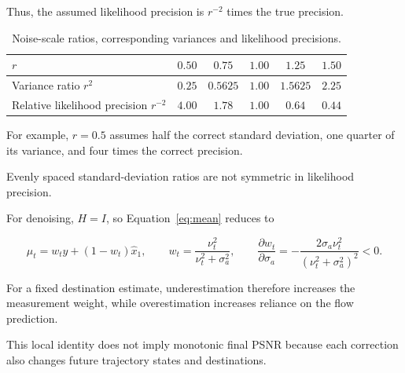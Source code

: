 \documentclass[11pt,a4paper]{article}
\newcommand{\sa}{\sigma_a}
\begin{document}
Thus, the assumed likelihood precision is $r^{-2}$ times the true
precision.

\begin{table}[htbp]

\centering
\small

\caption{
Noise-scale ratios, corresponding variances and likelihood precisions.
}
\label{tab:ratios}

\begin{tabular}{lccccc}

\toprule

$r$ &
$0.50$ &
$0.75$ &
$1.00$ &
$1.25$ &
$1.50$
\\

\midrule

Variance ratio $r^2$ &
$0.25$ &
$0.5625$ &
$1.00$ &
$1.5625$ &
$2.25$
\\

Relative likelihood precision $r^{-2}$ &
$4.00$ &
$1.78$ &
$1.00$ &
$0.64$ &
$0.44$
\\

\bottomrule

\end{tabular}

\end{table}

For example, $r=0.5$ assumes half the correct standard deviation,
one quarter of its variance, and four times the correct precision.

Evenly spaced standard-deviation ratios are not symmetric
in likelihood precision.

For denoising, $H=I$, so Equation~\eqref{eq:mean} reduces to

\begin{equation}
    \mu_t
    =
    w_t y
    +
    (1-w_t)\widehat x_1,
    \qquad
    w_t
    =
    \frac{\nu_t^2}{\nu_t^2+\sa^2},
    \qquad
    \frac{\partial w_t}{\partial\sa}
    =
    -
    \frac{2\sa\nu_t^2}
    {(\nu_t^2+\sa^2)^2}
    <0.
    \label{eq:denoisingweight}
\end{equation}

For a fixed destination estimate, underestimation therefore increases
the measurement weight, while overestimation increases reliance
on the flow prediction.

This local identity does not imply monotonic final PSNR because
each correction also changes future trajectory states and destinations.


\end{document}
